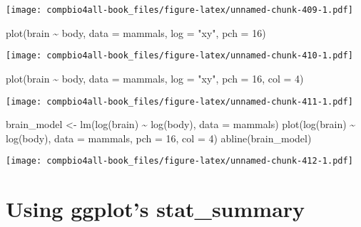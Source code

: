 \documentclass[
]{book}
\newenvironment{Shaded}{\begin{snugshade}}{\end{snugshade}}
\newcommand{\AttributeTok}[1]{\textcolor[rgb]{0.77,0.63,0.00}{#1}}
\newcommand{\DecValTok}[1]{\textcolor[rgb]{0.00,0.00,0.81}{#1}}
\newcommand{\FunctionTok}[1]{\textcolor[rgb]{0.00,0.00,0.00}{#1}}
\newcommand{\NormalTok}[1]{#1}
\newcommand{\OtherTok}[1]{\textcolor[rgb]{0.56,0.35,0.01}{#1}}
\newcommand{\SpecialCharTok}[1]{\textcolor[rgb]{0.00,0.00,0.00}{#1}}
\newcommand{\StringTok}[1]{\textcolor[rgb]{0.31,0.60,0.02}{#1}}
\begin{document}
\texttt{[image: compbio4all-book\_files/figure-latex/unnamed-chunk-409-1.pdf]}

\begin{Shaded}
\begin{Highlighting}[]
\FunctionTok{plot}\NormalTok{(brain }\SpecialCharTok{\textasciitilde{}}\NormalTok{ body, }\AttributeTok{data =}\NormalTok{ mammals, }\AttributeTok{log =} \StringTok{"xy"}\NormalTok{, }\AttributeTok{pch =} \DecValTok{16}\NormalTok{)}
\end{Highlighting}
\end{Shaded}

\texttt{[image: compbio4all-book\_files/figure-latex/unnamed-chunk-410-1.pdf]}

\begin{Shaded}
\begin{Highlighting}[]
\FunctionTok{plot}\NormalTok{(brain }\SpecialCharTok{\textasciitilde{}}\NormalTok{ body, }\AttributeTok{data =}\NormalTok{ mammals, }\AttributeTok{log =} \StringTok{"xy"}\NormalTok{, }\AttributeTok{pch =} \DecValTok{16}\NormalTok{, }\AttributeTok{col =} \DecValTok{4}\NormalTok{)}
\end{Highlighting}
\end{Shaded}

\texttt{[image: compbio4all-book\_files/figure-latex/unnamed-chunk-411-1.pdf]}

\begin{Shaded}
\begin{Highlighting}[]
\NormalTok{brain\_model }\OtherTok{\textless{}{-}} \FunctionTok{lm}\NormalTok{(}\FunctionTok{log}\NormalTok{(brain) }\SpecialCharTok{\textasciitilde{}} \FunctionTok{log}\NormalTok{(body), }\AttributeTok{data =}\NormalTok{ mammals)}
\FunctionTok{plot}\NormalTok{(}\FunctionTok{log}\NormalTok{(brain) }\SpecialCharTok{\textasciitilde{}} \FunctionTok{log}\NormalTok{(body), }\AttributeTok{data =}\NormalTok{ mammals,  }\AttributeTok{pch =} \DecValTok{16}\NormalTok{, }\AttributeTok{col =} \DecValTok{4}\NormalTok{)}
\FunctionTok{abline}\NormalTok{(brain\_model)}
\end{Highlighting}
\end{Shaded}

\texttt{[image: compbio4all-book\_files/figure-latex/unnamed-chunk-412-1.pdf]}

\hypertarget{using-ggplots-stat_summary}{%
\chapter{Using ggplot's stat\_summary}\label{using-ggplots-stat_summary}}
\end{document}
